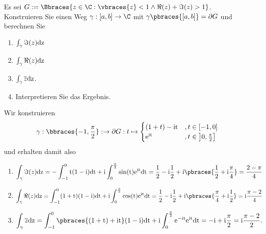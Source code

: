 \begin{exercise}
    Es sei $G := \Bbraces{z \in \C : \vbraces{z} < 1 \land \Re(z) + \Im(z) > 1}$. Konstruieren Sie einen Weg $\gamma:[a, b] \to \C$ mit $\gamma\pbraces{[a, b]} = \partial G$ und berechnen Sie 
    \begin{enumerate}[label = \alph*)]
        \item $\int_\gamma \Im(z) \rm{d}z$
        \item $\int_\gamma \Re(z) \rm{d}z$
        \item $\int_\gamma \overline{z} \rm{d}z$.
        \item Interpretieren Sie das Ergebnis.
    \end{enumerate}
\end{exercise}
\begin{solution}
    Wir konstruieren 
    \begin{align*}
        \gamma: \bbraces{-1, \frac{\pi}{2}}: \to \partial G: t \mapsto 
        \begin{cases}
            (1 + t) - \rm{i}t  &, t \in [-1, 0] \\
            \rm{e}^{it} &, t \in \left] 0, \frac{\pi}{2} \right]
        \end{cases}
    \end{align*}
    und erhalten damit also
    \begin{enumerate}[label = \alph*)]
        \item 
        \begin{align*}
            \int_\gamma \Im(z) \rm{d}z = -\int_{-1}^0 t (1 - \rm{i}) \rm{d}t + \rm{i} \int_0^{\frac{\pi}{2}} \sin(t) \rm{e}^{\rm{i}t} \rm{d}t = \frac{1}{2} - \rm{i} \frac{1}{2} + i \pbraces{\frac{1}{2} + \rm{i} \frac{\pi}{4}} = \frac{2 - \pi}{4}
        \end{align*}
        \item 
        \begin{align*}
            \int_\gamma \Re(z) \rm{d}z = \int_{-1}^0 (1 + t) (1 - \rm{i}) \rm{d}t + \rm{i} \int_0^{\frac{\pi}{2}} \cos(t) \rm{e}^{\rm{i}t} \rm{d}t = \frac{1}{2} - \rm{i}\frac{1}{2} + \rm{i} \pbraces{\frac{\pi}{4} + \rm{i} \frac{1}{2}} = \rm{i} \frac{\pi - 2}{4}
        \end{align*}
        \item 
        \begin{align*}
            \int_\gamma \overline{z} \rm{d}z = \int_{-1}^0 \pbraces{(1 + t) + \rm{i}t} (1 - i) \rm{d}t + \rm{i} \int_0^\frac{\pi}{2} \rm{e}^{-\rm{i} t} \rm{e}^{\rm{i} t} \rm{d}t = -\rm{i} + \rm{i} \frac{\pi}{2} = \rm{i}\frac{\pi - 2}{2}.

\end{align*}
\end{enumerate}
\end{solution}
